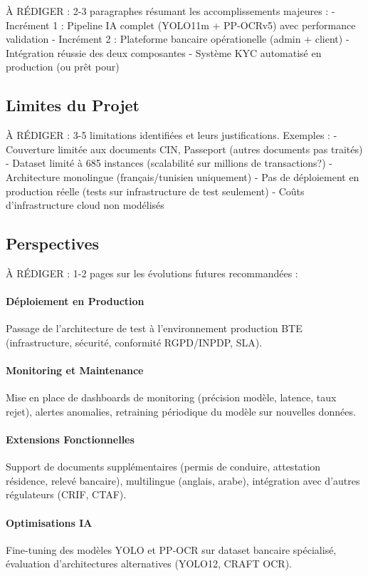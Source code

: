 À RÉDIGER : 2-3 paragraphes résumant les accomplissements majeures :
- Incrément 1 : Pipeline IA complet (YOLO11m + PP-OCRv5) avec performance validation
- Incrément 2 : Plateforme bancaire opérationelle (admin + client)
- Intégration réussie des deux composantes
- Système KYC automatisé en production (ou prêt pour)

\subsection{Limites du Projet}

À RÉDIGER : 3-5 limitations identifiées et leurs justifications. Exemples :
- Couverture limitée aux documents CIN, Passeport (autres documents pas traités)
- Dataset limité à 685 instances (scalabilité sur millions de transactions?)
- Architecture monolingue (français/tunisien uniquement)
- Pas de déploiement en production réelle (tests sur infrastructure de test seulement)
- Coûts d'infrastructure cloud non modélisés

\subsection{Perspectives}

À RÉDIGER : 1-2 pages sur les évolutions futures recommandées :

\paragraph{Déploiement en Production}
Passage de l'architecture de test à l'environnement production BTE (infrastructure, sécurité, conformité RGPD/INPDP, SLA).

\paragraph{Monitoring et Maintenance}
Mise en place de dashboards de monitoring (précision modèle, latence, taux rejet), alertes anomalies, retraining périodique du modèle sur nouvelles données.

\paragraph{Extensions Fonctionnelles}
Support de documents supplémentaires (permis de conduire, attestation résidence, relevé bancaire), multilingue (anglais, arabe), intégration avec d'autres régulateurs (CRIF, CTAF).

\paragraph{Optimisations IA}
Fine-tuning des modèles YOLO et PP-OCR sur dataset bancaire spécialisé, évaluation d'architectures alternatives (YOLO12, CRAFT OCR).

